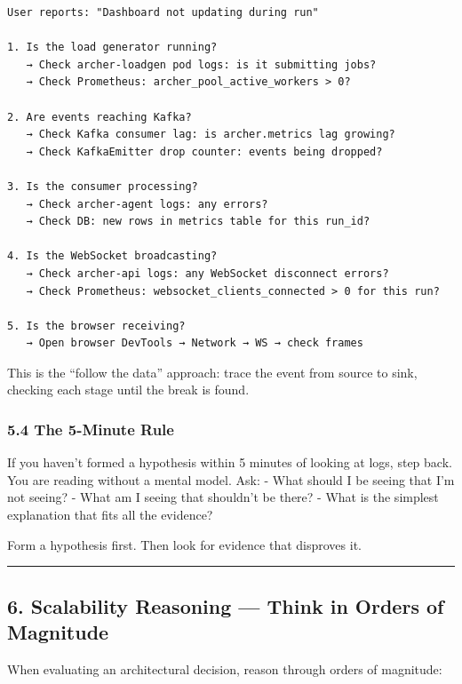 \documentclass[
]{article}
\begin{document}
\begin{verbatim}
User reports: "Dashboard not updating during run"

1. Is the load generator running?
   → Check archer-loadgen pod logs: is it submitting jobs?
   → Check Prometheus: archer_pool_active_workers > 0?

2. Are events reaching Kafka?
   → Check Kafka consumer lag: is archer.metrics lag growing?
   → Check KafkaEmitter drop counter: events being dropped?

3. Is the consumer processing?
   → Check archer-agent logs: any errors?
   → Check DB: new rows in metrics table for this run_id?

4. Is the WebSocket broadcasting?
   → Check archer-api logs: any WebSocket disconnect errors?
   → Check Prometheus: websocket_clients_connected > 0 for this run?

5. Is the browser receiving?
   → Open browser DevTools → Network → WS → check frames
\end{verbatim}

This is the ``follow the data'' approach: trace the event from source to
sink, checking each stage until the break is found.

\hypertarget{the-5-minute-rule}{%
\subsubsection{5.4 The 5-Minute Rule}\label{the-5-minute-rule}}

If you haven't formed a hypothesis within 5 minutes of looking at logs,
step back. You are reading without a mental model. Ask: - What should I
be seeing that I'm not seeing? - What am I seeing that shouldn't be
there? - What is the simplest explanation that fits all the evidence?

Form a hypothesis first. Then look for evidence that disproves it.

\begin{center}\rule{0.5\linewidth}{0.5pt}\end{center}

\hypertarget{scalability-reasoning-think-in-orders-of-magnitude}{%
\subsection{6. Scalability Reasoning --- Think in Orders of
Magnitude}\label{scalability-reasoning-think-in-orders-of-magnitude}}

When evaluating an architectural decision, reason through orders of
magnitude:
\end{document}
